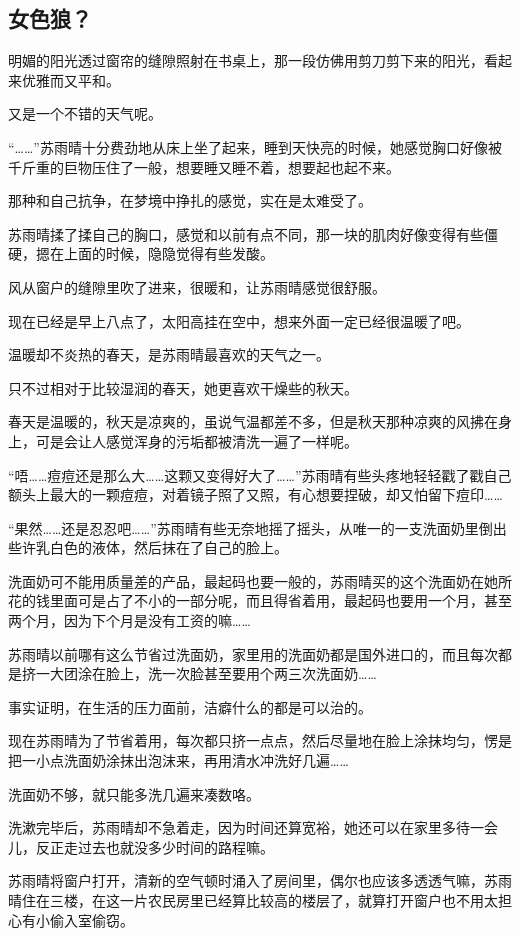 \subsection{女色狼？}

明媚的阳光透过窗帘的缝隙照射在书桌上，那一段仿佛用剪刀剪下来的阳光，看起来优雅而又平和。

又是一个不错的天气呢。

“……”苏雨晴十分费劲地从床上坐了起来，睡到天快亮的时候，她感觉胸口好像被千斤重的巨物压住了一般，想要睡又睡不着，想要起也起不来。

那种和自己抗争，在梦境中挣扎的感觉，实在是太难受了。

苏雨晴揉了揉自己的胸口，感觉和以前有点不同，那一块的肌肉好像变得有些僵硬，摁在上面的时候，隐隐觉得有些发酸。

风从窗户的缝隙里吹了进来，很暖和，让苏雨晴感觉很舒服。

现在已经是早上八点了，太阳高挂在空中，想来外面一定已经很温暖了吧。

温暖却不炎热的春天，是苏雨晴最喜欢的天气之一。

只不过相对于比较湿润的春天，她更喜欢干燥些的秋天。

春天是温暖的，秋天是凉爽的，虽说气温都差不多，但是秋天那种凉爽的风拂在身上，可是会让人感觉浑身的污垢都被清洗一遍了一样呢。

“唔……痘痘还是那么大……这颗又变得好大了……”苏雨晴有些头疼地轻轻戳了戳自己额头上最大的一颗痘痘，对着镜子照了又照，有心想要捏破，却又怕留下痘印……

“果然……还是忍忍吧……”苏雨晴有些无奈地摇了摇头，从唯一的一支洗面奶里倒出些许乳白色的液体，然后抹在了自己的脸上。

洗面奶可不能用质量差的产品，最起码也要一般的，苏雨晴买的这个洗面奶在她所花的钱里面可是占了不小的一部分呢，而且得省着用，最起码也要用一个月，甚至两个月，因为下个月是没有工资的嘛……

苏雨晴以前哪有这么节省过洗面奶，家里用的洗面奶都是国外进口的，而且每次都是挤一大团涂在脸上，洗一次脸甚至要用个两三次洗面奶……

事实证明，在生活的压力面前，洁癖什么的都是可以治的。

现在苏雨晴为了节省着用，每次都只挤一点点，然后尽量地在脸上涂抹均匀，愣是把一小点洗面奶涂抹出泡沫来，再用清水冲洗好几遍……

洗面奶不够，就只能多洗几遍来凑数咯。

洗漱完毕后，苏雨晴却不急着走，因为时间还算宽裕，她还可以在家里多待一会儿，反正走过去也就没多少时间的路程嘛。

苏雨晴将窗户打开，清新的空气顿时涌入了房间里，偶尔也应该多透透气嘛，苏雨晴住在三楼，在这一片农民房里已经算比较高的楼层了，就算打开窗户也不用太担心有小偷入室偷窃。


